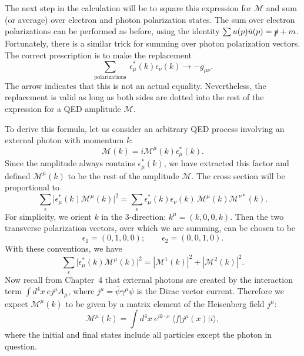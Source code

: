 The next step in the calculation will be to square this expression for
$\mathcal{M}$ and sum (or average) over electron and photon polarization
states.  The sum over electron polarizations can be performed as before, using
the identity $\sum u(p)\bar{u}(p) = \slashed{p} + m$.  Fortunately, there is a
similar trick for summing over photon polarization vectors.  The correct
prescription is to make the replacement
\begin{equation}
  \sum_{\text{polarizations}}\ \epsilon^{*}_\mu(k)\epsilon_\nu(k)
    \to -g_{\mu\nu} .
  \label{eq:5.75}
\end{equation}
The arrow indicates that this is not an actual equality.  Nevertheless, the
replacement is valid as long as both sides are dotted into the rest of the
expression for a QED amplitude $\mathcal{M}$.

To derive this formula, let us consider an arbitrary QED process involving an
external photon with momentum $k$:
\begin{equation}
  \mathcal{M}(k) = i\mathcal{M}^{\mu}(k)\epsilon^{*}_\mu(k) .
  \label{eq:5.76}
\end{equation}
Since the amplitude always contains $\epsilon^{*}_\mu(k)$, we have extracted
this factor and defined $\mathcal{M}^{\mu}(k)$ to be the rest of the amplitude
$\mathcal{M}$.  The cross section will be proportional to
\begin{equation}
  \sum_{\epsilon} \bigl| \epsilon^{*}_\mu(k)\mathcal{M}^{\mu}(k) \bigr|^2
    = \sum_{\epsilon} \epsilon^{*}_\mu(k)\epsilon_\nu(k)\,
      \mathcal{M}^{\mu}(k)\mathcal{M}^{\nu*}(k) .
\end{equation}
For simplicity, we orient $k$ in the 3-direction: $k^\mu = (k, 0, 0, k)$.
Then the two transverse polarization vectors, over which we are summing, can
be chosen to be
\begin{equation}
  \epsilon_1 = (0, 1, 0, 0);\qquad \epsilon_2 = (0, 0, 1, 0) .
\end{equation}
With these conventions, we have
\begin{equation}
  \sum_{\epsilon} \bigl| \epsilon^{*}_\mu(k)\mathcal{M}^{\mu}(k) \bigr|^2
    = |\mathcal{M}^1(k)|^2 + |\mathcal{M}^2(k)|^2 .
  \label{eq:5.77}
\end{equation}
Now recall from Chapter~4 that external photons are created by the interaction
term $\int d^4x\ e j^\mu A_\mu$, where $j^\mu = \bar{\psi}\gamma^\mu\psi$ is
the Dirac vector current.  Therefore we expect $\mathcal{M}^{\mu}(k)$ to be
given by a matrix element of the Heisenberg field $j^\mu$:
\begin{equation}
  \mathcal{M}^{\mu}(k) = \int d^4x\ e^{ik\cdot x}\ \langle f|j^\mu(x)|i\rangle ,
  \label{eq:5.78}
\end{equation}
where the initial and final states include all particles except the photon in
question.

